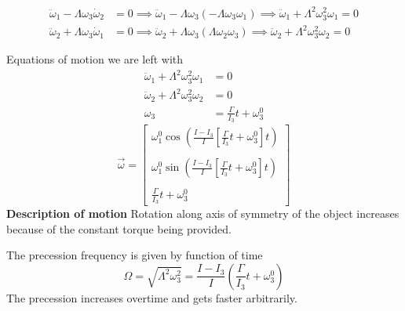 \documentclass[letter, 10pts]{article}
\begin{document}
\[
\begin{aligned}
\ddot{\omega}_1 - \Lambda  \omega_3 \dot \omega_2 &= 0
\implies \ddot{\omega}_1 - \Lambda \omega_3 (- \Lambda \omega_3 \omega_1) 
\implies \ddot{\omega}_1 + \Lambda^2 \omega_3^2 \omega_1 = 0
\\
 \ddot{\omega}_2 + \Lambda  \omega_3 \dot \omega_1 &= 0
 \implies \ddot{\omega}_2 + \Lambda \omega_3 \left(\Lambda \omega_2 \omega_3\right)
 \implies \ddot{\omega}_2 + \Lambda^2 \omega_3^2 \omega_2 = 0
\end{aligned}
\]


Equations of motion we are left with 
\begin{align*}
	\ddot{\omega}_1 + \Lambda^2 \omega_3^2 \omega_1 &= 0 \\ 
	\ddot{\omega}_2 + \Lambda^2 \omega_3^2 \omega_2 &= 0 \\ 
	\omega_3 &= \frac{\Gamma}{I_3}t + \omega_3^{0}
\end{align*}
\[
\boxed{
\vec{\omega} = 
\begin{bmatrix} 
	\omega_1^{0} \cos( \frac{I - I_3}{I}\left[ \frac{\Gamma}{I_3}t + \omega_3^{0}\right]t )
	\\
	\
	\\
	\omega_1^{0} \sin( \frac{I - I_3}{I}\left[ \frac{\Gamma}{I_3}t + \omega_3^{0}\right]t )
	\\ 
	\
	\\
	\frac{\Gamma}{I_3}t + \omega_3^{0}
\end{bmatrix} 
}
\] 
\textbf{Description of motion}
Rotation along axis of symmetry of the object increases because of the constant torque being provided. 

The precession frequency is given by function of time
\[
\Omega = \sqrt{\Lambda^2 \omega_3^2}  =  \frac{I-I_3}{I} \left(
\frac{\Gamma}{I_3}t + \omega_3^{0}\right)
\] 
The precession increases overtime and gets faster arbitrarily. 
\end{document}
